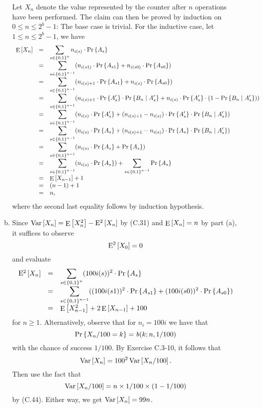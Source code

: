 \begin{enumerate}[\thechapter-1]
\begin{enumerate}[(a)]
Let $X_n$ denote the value represented by the counter after $n$  operations have been performed. The claim can then be proved by induction on $0 \leq n \leq 2^b - 1$: The base case is trivial. For the inductive case, let $1 \leq n \leq 2^b - 1$, we have
\[
\begin{array}{lll}
\ex{X_n} & = & \ds{\sum_{s \in \cartpwr{\sete{0, 1}}{n}} n_{i(s)} \multp \pr{A_s}} \cr
         & = & \ds{\sum_{s \in \cartpwr{\sete{0, 1}}{n - 1}} (n_{i(s1)} \multp \pr{A_{s1}} + n_{i(s0)} \multp \pr{A_{s0}})} \cr
         & = & \ds{\sum_{s \in \cartpwr{\sete{0, 1}}{n - 1}} (n_{i(s) + 1} \multp \pr{A_{s1}} + n_{i(s)} \multp \pr{A_{s0}})} \cr
         & = & \ds{\sum_{s \in \cartpwr{\sete{0, 1}}{n - 1}} (n_{i(s) + 1} \multp \pr{A'_s} \multp \pr{B_n \given A'_s} + n_{i(s)} \multp \pr{A'_s} \multp (1 - \pr{B_n \given A'_s}))} \cr
         & = & \ds{\sum_{s \in \cartpwr{\sete{0, 1}}{n - 1}} (n_{i(s)} \multp \pr{A'_s} + (n_{i(s) + 1} - n_{i(s)}) \multp \pr{A'_s} \multp \pr{B_n \given A'_s})} \cr
         & = & \ds{\sum_{s \in \cartpwr{\sete{0, 1}}{n - 1}} (n_{i(s)} \multp \pr{A_s} + (n_{i(s) + 1} - n_{i(s)}) \multp \pr{A_s} \multp \pr{B_n \given A'_s})} \cr
         & = & \ds{\sum_{s \in \cartpwr{\sete{0, 1}}{n - 1}} (n_{i(s)} \multp \pr{A_s} + \pr{A_s})} \cr
         & = & \ds{\sum_{s \in \cartpwr{\sete{0, 1}}{n - 1}} (n_{i(s)} \multp \pr{A_s}) + \sum_{s \in \cartpwr{\sete{0, 1}}{n - 1}} \pr{A_s}} \cr
         & = & \ex{X_{n - 1}} + 1 \cr
         & = & (n - 1) + 1 \cr
         & = & n, \cr
\end{array}
\]
where the second last equality follows by induction hypothesis.
\item Since $\var{X_n} = \ex{X_n^2} - \ex[2]{X_n}$ by (C.31) and $\ex{X_n} = n$ by part (a), it suffices to observe
\[
\ex[2]{X_0} = 0
\]
and evaluate
\[
\begin{array}{lll}
\ex[2]{X_n} & = & \ds{\sum_{s \in \cartpwr{\sete{0, 1}}{n}} (100i(s))^2 \multp \pr{A_s}} \cr
            & = & \ds{\sum_{s \in \cartpwr{\sete{0, 1}}{n - 1}} ((100i(s1))^2 \multp \pr{A_{s1}} + (100i(s0))^2 \multp \pr{A_{s0}})} \cr
            & = & \ex{X_{n - 1}^2} + 2 \ex{X_{n - 1}} + 100 \cr
\end{array}
\]
for $n \geq 1$. Alternatively, observe that for $n_i = 100i$ we have that
\[
\Pr\left\{X_n / 100 = k\right\} = \mathit{b}(k; n, 1/100)
\]
with the chance of success $1/100$. By Exercise C.3-10, it follows that
\[
\mathop{\mathrm{Var}}\left[X_n\right] = 100^2 \mathop{\mathrm{Var}}\left[X_n / 100\right].
\]
Then use the fact that
\[
\mathop{\mathrm{Var}}\left[X_n / 100\right] = n \times 1/100 \times (1 - 1/100)
\]
by (C.44). Either way, we get $\mathop{\mathrm{Var}}\left[X_n\right] = 99n$.

\end{enumerate}
\end{enumerate}
